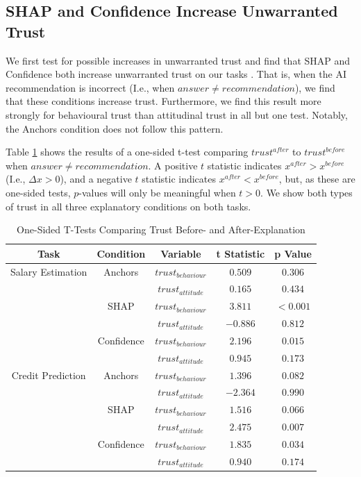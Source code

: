 \subsection{SHAP and Confidence Increase Unwarranted Trust}\label{ssec:ttests}
We first test for possible increases in unwarranted trust and find that SHAP and Confidence both increase unwarranted trust on our tasks \cite{natarajan_binns_2022}. That is, when the AI recommendation is incorrect (I.e., when $answer \neq recommendation$), we find that these conditions increase trust. Furthermore, we find this result more strongly for behavioural trust than attitudinal trust in all but one test. Notably, the Anchors condition does not follow this pattern.

Table \ref{tab:delta-trust-t} shows the results of a one-sided t-test comparing $trust^{after}$ to $trust^{before}$ when $answer \neq recommendation$. A positive $t$ statistic indicates $x^{after} > x^{before}$ (I.e., $\Delta x > 0$), and a negative $t$ statistic indicates $x^{after} < x^{before}$, but, as these are one-sided tests, $p$-values will only be meaningful when $t > 0$. We show both types of trust in all three explanatory conditions on both tasks.

\begin{table}[htbp]
    \caption{One-Sided T-Tests Comparing Trust Before- and After-Explanation}
    \begin{center}
    \begin{tabular}{ccccc}
        \toprule
        Task & Condition & Variable & t Statistic & p Value \\ 
        \midrule
        Salary Estimation & Anchors & $trust_{behaviour}$ & $0.509$ & $0.306$ \\
        & & $trust_{attitude}$ & $0.165$ & $0.434$ \\
        & SHAP & $trust_{behaviour}$ & $\mathbf{3.811}$ & $\mathbf{<0.001}$ \\
        & & $trust_{attitude}$ & $-0.886$ & $0.812$ \\
        & Confidence & $trust_{behaviour}$ & $\mathbf{2.196}$ & $\mathbf{0.015}$ \\
        & & $trust_{attitude}$ & $0.945$ & $0.173$ \\
        \midrule
        Credit Prediction & Anchors & $trust_{behaviour}$ & $1.396$ & $0.082$ \\
        & & $trust_{attitude}$ & $-2.364$ & $0.990$ \\
        & SHAP & $trust_{behaviour}$ & $1.516$ & $0.066$ \\
        & & $trust_{attitude}$ & $\mathbf{2.475}$ & $\mathbf{0.007}$ \\
        & Confidence & $trust_{behaviour}$ & $\mathbf{1.835}$ & $\mathbf{0.034}$ \\
        & & $trust_{attitude}$ & $0.940$ & $0.174$ \\
        \bottomrule
    \end{tabular}
    \label{tab:delta-trust-t}
    \end{center}
\end{table}


